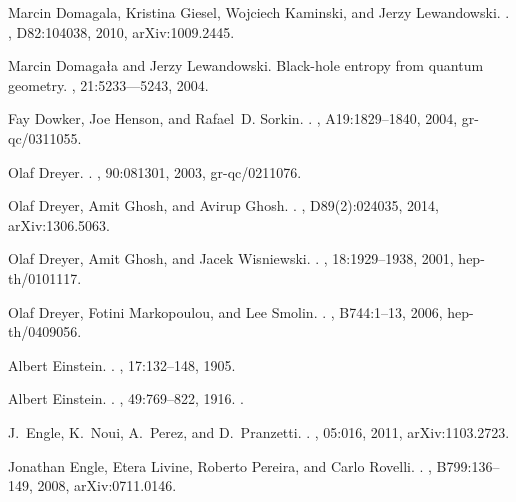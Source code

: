 \documentclass[aps, nofootinbib,superscriptaddress,12pt]{revtex4-2}
\begin{document}
\begin{thebibliography}{100}
Marcin Domagala, Kristina Giesel, Wojciech Kaminski, and Jerzy Lewandowski.
.
, D82:104038, 2010, arXiv:1009.2445.

Marcin Domaga{\l}a and Jerzy Lewandowski.
\newblock Black-hole entropy from quantum geometry.
, 21:5233---5243, 2004.

Fay Dowker, Joe Henson, and Rafael~D. Sorkin.
.
, A19:1829--1840, 2004, gr-qc/0311055.

Olaf Dreyer.
.
, 90:081301, 2003, gr-qc/0211076.

Olaf Dreyer, Amit Ghosh, and Avirup Ghosh.
.
, D89(2):024035, 2014, arXiv:1306.5063.

Olaf Dreyer, Amit Ghosh, and Jacek Wisniewski.
.
, 18:1929--1938, 2001, hep-th/0101117.

Olaf Dreyer, Fotini Markopoulou, and Lee Smolin.
.
, B744:1--13, 2006, hep-th/0409056.

Albert Einstein.
.
, 17:132--148, 1905.

Albert Einstein.
.
, 49:769--822, 1916.
.

J.~Engle, K.~Noui, A.~Perez, and D.~Pranzetti.
.
, 05:016, 2011, arXiv:1103.2723.

Jonathan Engle, Etera Livine, Roberto Pereira, and Carlo Rovelli.
.
, B799:136--149, 2008, arXiv:0711.0146.


\end{thebibliography}
\end{document}
